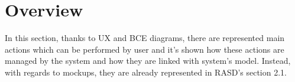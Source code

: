 \section{Overview}
In this section, thanks to UX and BCE diagrams, there are represented main actions which can be performed by user and it's shown how these actions are managed by the system and how they are linked with system's model.
Instead, with regards to mockups, they are already represented in RASD's section 2.1.

